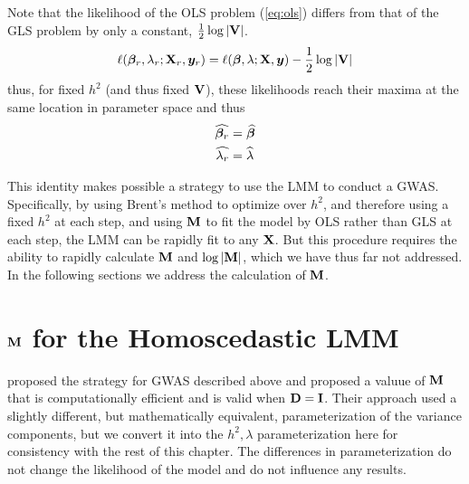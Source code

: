 Note that the likelihood of the OLS problem (\cref{eq:ols}) differs from that of the GLS problem by only a constant, $\frac{1}{2}\log|\mathbf{V}|$.
\begin{align}
  \ell(\boldsymbol{\beta}_r, \lambda_r; \mathbf{X}_r, \bm{y}_r) = \ell(\boldsymbol{\beta}, \lambda; \mathbf{X}, \bm{y}) -\frac{1}{2}\log|\mathbf{V}|
\end{align}
thus, for fixed $h^2$ (and thus fixed $\mathbf{V}$), these likelihoods reach their maxima at the same location in parameter space and thus
\begin{align}
\widehat{\boldsymbol{\beta}_r} &= \widehat{\boldsymbol{\beta}}\\
\widehat{\lambda_r} & = \widehat{\lambda}
\end{align}

This identity makes possible a strategy to use the LMM to conduct a GWAS.
Specifically, by using Brent's method to optimize over $h^2$, and therefore using a fixed $h^2$ at each step, and using $\mathbf{M}$ to fit the model by OLS rather than GLS at each step, the LMM can be rapidly fit to any $\mathbf{X}$.
But this procedure requires the ability to rapidly calculate $\mathbf{M}$ and $\log \left| \mathbf{M} \right|$, which we have thus far not addressed.
In the following sections we address the calculation of $\mathbf{M}$.





\newpage
\section{\texorpdfstring{$\mathbf{M}$}{M} for the Homoscedastic LMM}

\citet{Kang2008} proposed the strategy for GWAS described above and proposed a valuue of $\mathbf{M}$ that is computationally efficient and is valid when $\mathbf{D} = \mathbf{I}$.
Their approach used a slightly different, but mathematically equivalent, parameterization of the variance components, but we convert it into the $h^2, \lambda$ parameterization here for consistency with the rest of this chapter.
The differences in parameterization do not change the likelihood of the model and do not influence any results.

